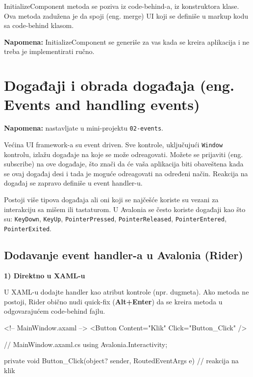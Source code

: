 \documentclass[11pt,a4paper]{article}
\begin{document}
InitializeComponent metoda se poziva iz code-behind-a, iz konstruktora klase. Ova metoda zadužena je da spoji (eng. merge) UI koji se definiše u markup kodu sa code-behind klasom.

\textbf{Napomena:} InitializeComponent se generiše za vas kada se kreira aplikacija i ne treba je implementirati ručno.

\section{Događaji i obrada događaja (eng. Events and handling events)}

\textbf{Napomena:} nastavljate u mini-projektu \texttt{02-events}.

Većina UI framework-a su event driven. Sve kontrole, uključujući \texttt{Window} kontrolu, izlažu događaje na koje se može odreagovati. Možete se prijaviti (eng. subscribe) na ove događaje, što znači da će vaša aplikacija biti obaveštena kada se ovaj događaj desi i tada je moguće odreagovati na određeni način. Reakcija na događaj se zapravo definiše u event handler-u.

Postoji više tipova događaja ali oni koji se najčešće koriste su vezani za interakciju sa mišem ili tastaturom. U Avalonia se često koriste događaji kao što su: \texttt{KeyDown}, \texttt{KeyUp}, \texttt{PointerPressed}, \texttt{PointerReleased}, \texttt{PointerEntered}, \texttt{PointerExited}.

\subsection{Dodavanje event handler-a u Avalonia (Rider)}

\textbf{1) Direktno u XAML-u}

U XAML-u dodajte handler kao atribut kontrole (npr. dugmeta). Ako metoda ne postoji, Rider obično nudi quick-fix (\textbf{Alt+Enter}) da se kreira metoda u odgovarajućem code-behind fajlu.

\begin{CodeBlock}
<!-- MainWindow.axaml -->
<Button Content="Klik" Click="Button_Click" />
\end{CodeBlock}

\begin{CodeBlock}
// MainWindow.axaml.cs
using Avalonia.Interactivity;

private void Button_Click(object? sender, RoutedEventArgs e)
{
    // reakcija na klik
}
\end{CodeBlock}
\end{document}
